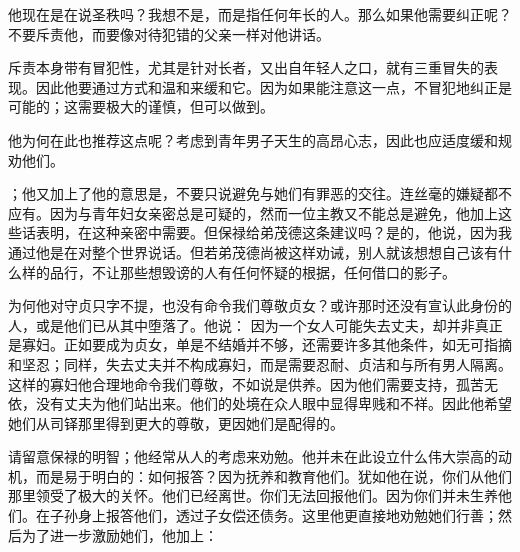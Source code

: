 \par

他现在是在说圣秩吗？我想不是，而是指任何年长的人。那么如果他需要纠正呢？不要斥责他，而要像对待犯错的父亲一样对他讲话。\par

 \par

斥责本身带有冒犯性，尤其是针对长者，又出自年轻人之口，就有三重冒失的表现。因此他要通过方式和温和来缓和它。因为如果能注意这一点，不冒犯地纠正是可能的；这需要极大的谨慎，但可以做到。\par

他为何在此也推荐这点呢？考虑到青年男子天生的高昂心志，因此也应适度缓和规劝他们。\par

；他又加上了他的意思是，不要只说避免与她们有罪恶的交往。连丝毫的嫌疑都不应有。因为与青年妇女亲密总是可疑的，然而一位主教又不能总是避免，他加上这些话表明，在这种亲密中需要。但保禄给弟茂德这条建议吗？是的，他说，因为我通过他是在对整个世界说话。但若弟茂德尚被这样劝诫，别人就该想想自己该有什么样的品行，不让那些想毁谤的人有任何怀疑的根据，任何借口的影子。\par

 \par

为何他对守贞只字不提，也没有命令我们尊敬贞女？或许那时还没有宣认此身份的人，或是他们已从其中堕落了。他说：  因为一个女人可能失去丈夫，却并非真正是寡妇。正如要成为贞女，单是不结婚并不够，还需要许多其他条件，如无可指摘和坚忍；同样，失去丈夫并不构成寡妇，而是需要忍耐、贞洁和与所有男人隔离。这样的寡妇他合理地命令我们尊敬，不如说是供养。因为他们需要支持，孤苦无依，没有丈夫为他们站出来。他们的处境在众人眼中显得卑贱和不祥。因此他希望她们从司铎那里得到更大的尊敬，更因她们是配得的。\par

 \par

请留意保禄的明智；他经常从人的考虑来劝勉。他并未在此设立什么伟大崇高的动机，而是易于明白的：如何报答？因为抚养和教育他们。犹如他在说，你们从他们那里领受了极大的关怀。他们已经离世。你们无法回报他们。因为你们并未生养他们。在子孙身上报答他们，透过子女偿还债务。这里他更直接地劝勉她们行善；然后为了进一步激励她们，他加上：\par

